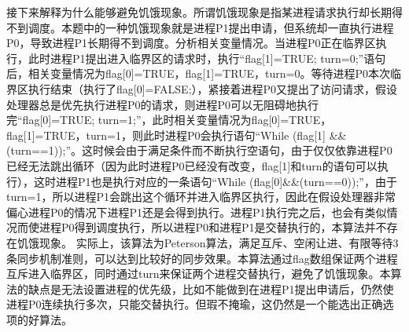 \begin{solution}
接下来解释为什么能够避免饥饿现象。所谓饥饿现象是指某进程请求执行却长期得不到调度。本题中的一种饥饿现象就是进程P1提出申请，但系统却一直执行进程P0，导致进程P1长期得不到调度。分析相关变量情况。当进程P0正在临界区执行，此时进程P1提出进入临界区的请求时，执行``flag{[}1{]}=TRUE;
turn=0;''语句后，相关变量情况为flag{[}0{]}=TRUE，flag{[}1{]}=TRUE，turn=0。等待进程P0本次临界区执行结束（执行了flag{[}0{]}=FALSE;），紧接着进程P0又提出了访问请求，假设处理器总是优先执行进程P0的请求，则进程P0可以无阻碍地执行完``flag{[}0{]}=TRUE;
turn=1;''，此时相关变量情况为flag{[}0{]}=TRUE，flag{[}1{]}=TRUE，turn=1，则此时进程P0会执行语句``While
(flag{[}1{]}
\&\&(turn==1));''。这时候会由于满足条件而不断执行空语句，由于仅仅依靠进程P0已经无法跳出循环（因为此时进程P0已经没有改变，flag{[}1{]}和turn的语句可以执行），这时进程P1也是执行对应的一条语句``While
(flag{[}0{]}\&\&(turn==0));''，由于turn=1，所以进程P1会跳出这个循环并进入临界区执行，因此在假设处理器非常偏心进程P0的情况下进程P1还是会得到执行。进程P1执行完之后，也会有类似情况而使进程P0得到调度执行，所以进程P0和进程P1是交替执行的，本算法并不存在饥饿现象。
实际上，该算法为Peterson算法，满足互斥、空闲让进、有限等待3条同步机制准则，可以达到比较好的同步效果。本算法通过flag数组保证两个进程互斥进入临界区，同时通过turn来保证两个进程交替执行，避免了饥饿现象。本算法的缺点是无法设置进程的优先级，比如不能做到在进程P1提出申请后，仍然使进程P0连续执行多次，只能交替执行。但瑕不掩瑜，这仍然是一个能选出正确选项的好算法。
\end{solution}
